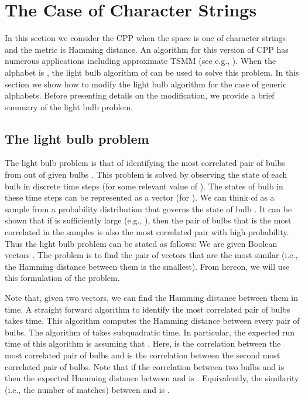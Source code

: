 \documentclass{article}
\theoremstyle{definition}
\theoremstyle{remark}
\begin{document}
\section{The Case of Character Strings}\label{sec4}
In this section we consider the CPP when the space is one of character strings and the metric is Hamming distance. An algorithm for this version of CPP has numerous applications including approximate TSMM (see e.g., \cite{BES03}). When the alphabet is , the light bulb algorithm of \cite{RSJ89} can be used to solve this problem. In this section we show how to modify the light bulb algorithm for the case of generic alphabets. Before presenting details on the modification, we provide a brief summary of the light bulb problem.

\subsection{The light bulb problem}
The light bulb problem is that of identifying the most correlated pair of bulbs from out of  given bulbs \newline . This problem is solved by observing the state of each bulb in  discrete time steps (for some relevant value of ). The states of bulb  in these  time steps can be represented as a vector  (for ). We can think of  as a sample from a probability distribution that governs the state of bulb . It can be shown that if  is sufficiently large (e.g., ), then the pair of bulbs that is the most correlated in the samples is also the most correlated pair with high probability. Thus the light bulb problem can be stated as follows: We are given  Boolean vectors . The problem is to find the pair of vectors that are the most similar (i.e., the Hamming distance between them is the smallest). From hereon, we will use this formulation of the problem.

   Note that, given two vectors, we can find the Hamming distance between them in  time. A straight forward algorithm to identify the most correlated pair of bulbs takes  time. This algorithm computes the Hamming distance between every pair of bulbs. The algorithm of \cite{RSJ89} takes subquadratic time. In particular, the expected run time of this algorithm is \newline  assuming that . Here,  is the correlation between the most correlated pair of bulbs and  is the correlation between the second most correlated pair of bulbs. Note that if the correlation between two bulbs  and  is  then the expected Hamming distance between  and  is . Equivalently, the similarity (i.e., the number of matches) between  and  is .
\end{document}
